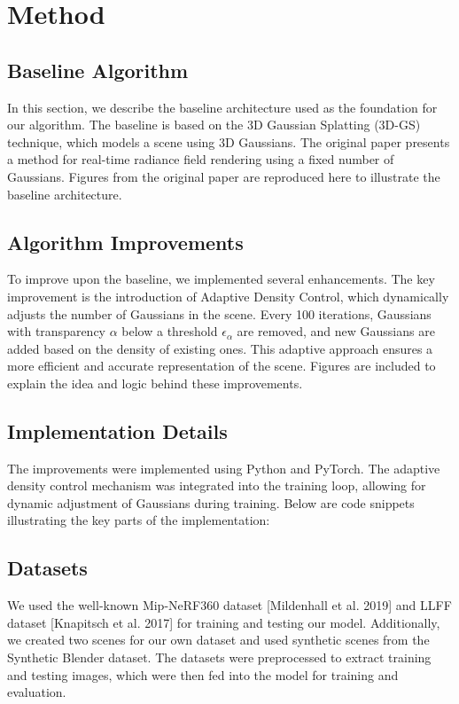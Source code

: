 \documentclass[11pt]{report}
\begin{document}
\chapter{Method}

\section{Baseline Algorithm}
In this section, we describe the baseline architecture used as the foundation for our algorithm. The baseline is based on the 3D Gaussian Splatting (3D-GS) technique, which models a scene using 3D Gaussians. The original paper presents a method for real-time radiance field rendering using a fixed number of Gaussians. Figures from the original paper are reproduced here to illustrate the baseline architecture.

\section{Algorithm Improvements}
To improve upon the baseline, we implemented several enhancements. The key improvement is the introduction of Adaptive Density Control, which dynamically adjusts the number of Gaussians in the scene. Every 100 iterations, Gaussians with transparency $\alpha$ below a threshold $\epsilon_\alpha$ are removed, and new Gaussians are added based on the density of existing ones. This adaptive approach ensures a more efficient and accurate representation of the scene. Figures are included to explain the idea and logic behind these improvements.

\section{Implementation Details}
The improvements were implemented using Python and PyTorch. The adaptive density control mechanism was integrated into the training loop, allowing for dynamic adjustment of Gaussians during training. Below are code snippets illustrating the key parts of the implementation:


\section{Datasets}
We used the well-known Mip-NeRF360 dataset [Mildenhall et al. 2019] and LLFF dataset [Knapitsch et al. 2017] for training and testing our model. Additionally, we created two scenes for our own dataset and used synthetic scenes from the Synthetic Blender dataset. The datasets were preprocessed to extract training and testing images, which were then fed into the model for training and evaluation.
\end{document}
